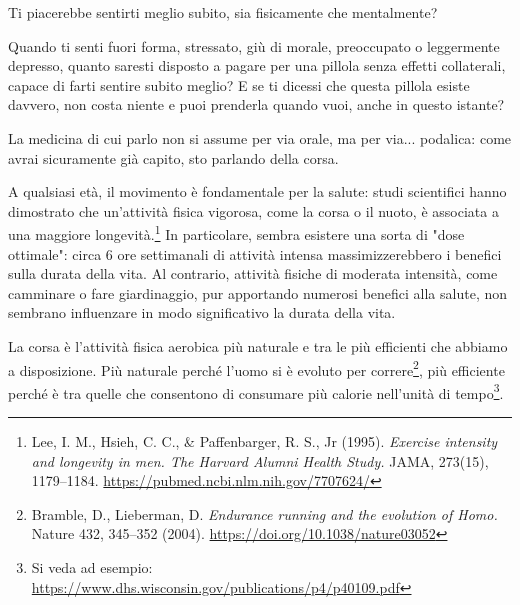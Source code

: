 Ti piacerebbe sentirti meglio subito, sia fisicamente che mentalmente?

Quando ti senti fuori forma, stressato, giù di morale,
preoccupato o leggermente depresso, quanto saresti disposto a pagare
per una pillola senza effetti collaterali, capace di farti sentire subito meglio?
E se ti dicessi che questa pillola esiste davvero, non costa niente
e puoi prenderla quando vuoi, anche in questo istante?

La medicina di cui parlo non si assume per via orale, ma per via... podalica:
come avrai sicuramente già capito, sto parlando della corsa.

A qualsiasi età, il movimento è fondamentale per la salute:
studi scientifici hanno dimostrato che un'attività fisica vigorosa, come la corsa o il nuoto,
è associata a una maggiore longevità.\footnote{
    Lee, I. M., Hsieh, C. C., \& Paffenbarger, R. S., Jr (1995).
    \emph{Exercise intensity and longevity in men. The Harvard Alumni Health Study.}
    JAMA, 273(15), 1179–1184.
    \url{https://pubmed.ncbi.nlm.nih.gov/7707624/}
}
In particolare, sembra esistere una sorta di "dose ottimale": circa 6 ore settimanali
di attività intensa massimizzerebbero i benefici sulla durata della vita. 
Al contrario, attività fisiche di moderata intensità, come camminare o fare giardinaggio,
pur apportando numerosi benefici alla salute,
non sembrano influenzare in modo significativo la durata della vita.




La corsa è l'attività fisica aerobica più naturale e tra le più efficienti che abbiamo a disposizione.
Più naturale perché l'uomo si è evoluto per correre\footnote{
    Bramble, D., Lieberman, D. 
    \emph{Endurance running and the evolution of Homo.}
    Nature 432, 345–352 (2004).
    \url{https://doi.org/10.1038/nature03052}},
più efficiente perché è tra quelle che consentono di consumare più calorie nell'unità di tempo\footnote{
    Si veda ad esempio:
    \url{https://www.dhs.wisconsin.gov/publications/p4/p40109.pdf}}.

